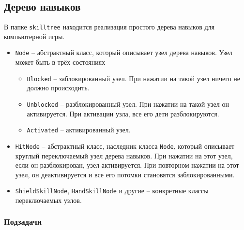 \documentclass{article}
\begin{document}
\subsection{Дерево навыков}
В папке \texttt{skilltree} находится реализация простого дерева навыков для компьютерной игры.
\begin{itemize}
\item \texttt{Node} -- абстрактный класс, который описывает узел дерева навыков. Узел может быть в трёх состояниях
\begin{itemize}
\item \texttt{Blocked} -- заблокированный узел. При нажатии на такой узел ничего не должно происходить.
\item \texttt{Unblocked} -- разблокированный узел. При нажатии на такой узел он активируется. При активации узла, все его дети разблокируются.
\item \texttt{Activated} -- активированный узел.
\end{itemize}
\item \texttt{HitNode} -- абстрактный класс, наследник класса \texttt{Node}, который описывает круглый переключаемый узел дерева навыков. При нажатии на этот узел, если он разблокирован, узел активируется. При повторном нажатии на этот узел, он деактивируется и все его потомки становятся заблокированными.

\item \texttt{ShieldSkillNode}, \texttt{HandSkillNode} и другие -- конкретные классы переключаемых узлов.
\end{itemize}



\subsubsection*{Подзадачи}
\end{document}
